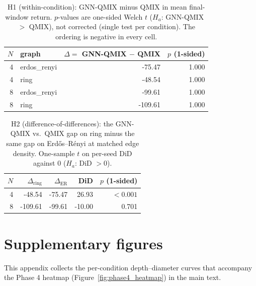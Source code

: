 \documentclass[10pt]{article}
\newcommand{\algoname}[1]{\textsc{#1}}
\newcommand{\qmix}{\algoname{QMIX}}
\newcommand{\gnnqmix}{\algoname{GNN-QMIX}}
\begin{document}
\begin{table}[!ht]
  \centering
  \small
  \caption{H1 (within-condition): GNN-QMIX minus QMIX in mean final-window
  return. $p$-values are one-sided Welch $t$ ($H_a$: \gnnqmix\ $>$ \qmix),
  not corrected (single test per condition). The ordering is negative in
  every cell.}
  \label{tab:phase2_h1}
  \begin{tabular}{rlrr}
    \toprule
    $N$ & graph & $\Delta = $ GNN-QMIX $-$ QMIX & $p$ (1-sided) \\
    \midrule
    4 & erdos\_renyi & -75.47 & 1.000 \\
4 & ring & -48.54 & 1.000 \\
8 & erdos\_renyi & -99.61 & 1.000 \\
8 & ring & -109.61 & 1.000 \\
    \bottomrule
  \end{tabular}
\end{table}

\begin{table}[!ht]
  \centering
  \small
  \caption{H2 (difference-of-differences): the GNN-QMIX vs.\ QMIX gap on
  ring minus the same gap on Erd\H{o}s--R\'enyi at matched edge density.
  One-sample $t$ on per-seed DiD against 0 ($H_a$: DiD $> 0$).}
  \label{tab:phase2_h2}
  \begin{tabular}{rrrrr}
    \toprule
    $N$ & $\Delta_{\text{ring}}$ & $\Delta_{\text{ER}}$ & DiD & $p$ (1-sided) \\
    \midrule
    4 & -48.54 & -75.47 & 26.93 & $<0.001$ \\
8 & -109.61 & -99.61 & -10.00 & 0.701 \\
    \bottomrule
  \end{tabular}
\end{table}

\section{Supplementary figures}
\label{app:figures}

This appendix collects the per-condition depth--diameter curves that
accompany the Phase 4 heatmap (Figure~\ref{fig:phase4_heatmap}) in the main
text.
\end{document}
